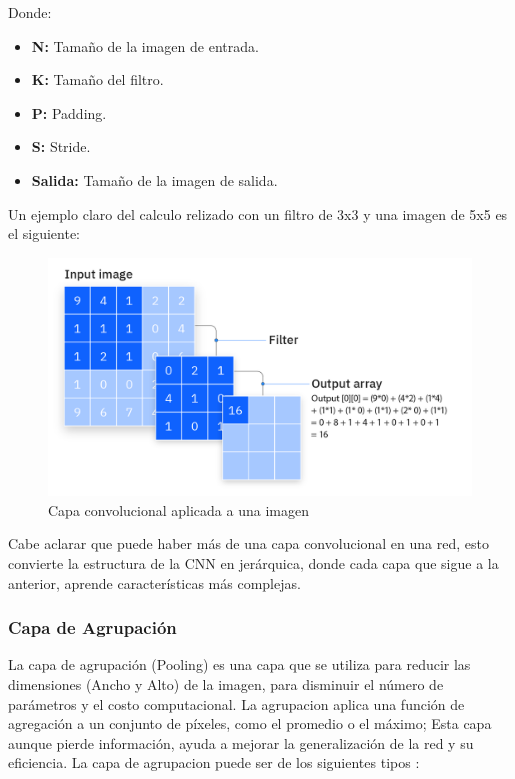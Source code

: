 Donde:
\begin{itemize}
    \item \textbf{N:} Tamaño de la imagen de entrada.
    \item \textbf{K:} Tamaño del filtro.
    \item \textbf{P:} Padding.
    \item \textbf{S:} Stride.
    \item \textbf{Salida:} Tamaño de la imagen de salida.
\end{itemize}

\newpage

Un ejemplo claro del calculo relizado con un filtro de 3x3 y una 
imagen de 5x5 es el siguiente:

\begin{figure}[ht!]
    \centering
    \includegraphics[width=\linewidth]{src/figures/kernel_calculation.png}
    \caption{Capa convolucional aplicada a una imagen \cite{kernel_calculation}}
    \label{fig:kernel_calculation}
\end{figure}

Cabe aclarar que puede haber más de una capa convolucional en una red,
esto convierte la estructura de la CNN en jerárquica, donde cada capa
que sigue a la anterior, aprende características más complejas.

\subsubsection{Capa de Agrupación}
La capa de agrupación (Pooling) es una capa que se utiliza para reducir
las dimensiones (Ancho y Alto) de la imagen, para disminuir el número
de parámetros y el costo computacional. La agrupacion aplica una función
de agregación a un conjunto de píxeles, como el promedio o el máximo; 
Esta capa aunque pierde información, ayuda a mejorar la generalización
de la red y su eficiencia. La capa de agrupacion puede ser de los 
siguientes tipos \cite{medium_pooling}:

